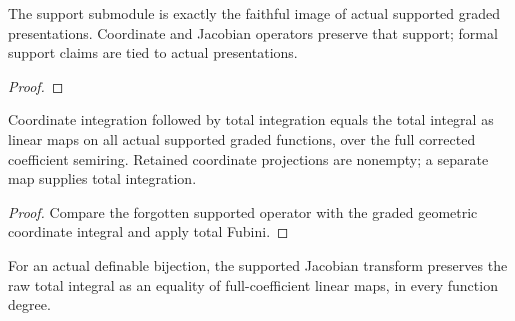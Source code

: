 \begin{definition}

\label{s7-support}


\leanok

The support submodule is exactly the faithful image of actual supported graded presentations. Coordinate and Jacobian operators preserve that support; formal support claims are tied to actual presentations.

\end{definition}

\begin{proof}


\leanok



\end{proof}

\begin{proposition}

\label{s7-11}


\leanok

Coordinate integration followed by total integration equals the total integral as linear maps on all actual supported graded functions, over the full corrected coefficient semiring. Retained coordinate projections are nonempty; a separate map supplies total integration.

\end{proposition}

\begin{proof}


\leanok

Compare the forgotten supported operator with the graded geometric coordinate integral and apply total Fubini.

\end{proof}

\begin{proposition}

\label{s7-12}


\leanok

For an actual definable bijection, the supported Jacobian transform preserves the raw total integral as an equality of full-coefficient linear maps, in every function degree.

\end{proposition}

